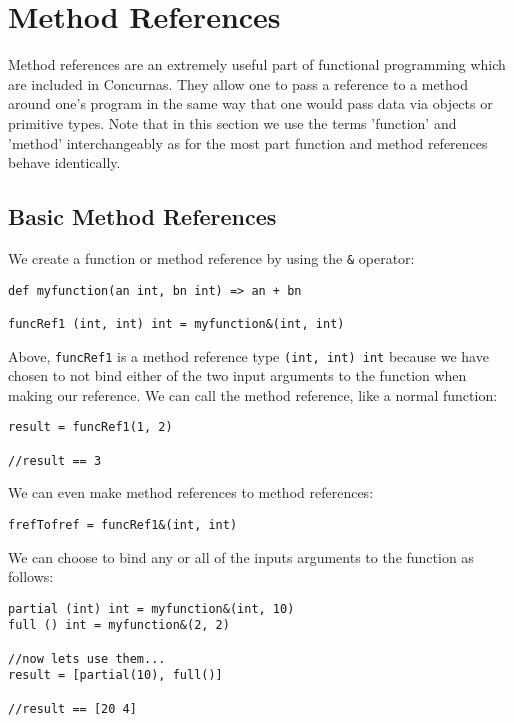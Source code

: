 \documentclass[conc-doc]{subfiles}
\begin{document}
	
	\chapter[Method References]{Method References}
	
Method references are an extremely useful part of functional programming which are included in Concurnas. They allow one to pass a reference to a method around one's program in the same way that one would pass data via objects or primitive types. Note that in this section we use the terms 'function' and 'method' interchangeably as for the most part function and method references behave identically. 

\section{Basic Method References}
We create a function or method reference by using the \lstinline{&} operator:

\begin{lstlisting}
def myfunction(an int, bn int) => an + bn

funcRef1 (int, int) int = myfunction&(int, int)
\end{lstlisting}

Above, \lstinline{funcRef1} is a method reference type \lstinline{(int, int) int} because we have chosen to not bind either of the two input arguments to the function when making our reference. We can call the method reference, like a normal function:

\begin{lstlisting}
result = funcRef1(1, 2)

//result == 3
\end{lstlisting}

We can even make method references to method references:

\begin{lstlisting}
frefTofref = funcRef1&(int, int)
\end{lstlisting}

We can choose to bind any or all of the inputs arguments to the function as follows:

\begin{lstlisting}
partial (int) int = myfunction&(int, 10)
full () int = myfunction&(2, 2)

//now lets use them...
result = [partial(10), full()]

//result == [20 4]
\end{lstlisting}
\end{document}
